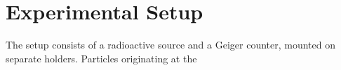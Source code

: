 \section{Experimental Setup}

The setup consists of a radioactive source and a Geiger counter, mounted on separate holders. Particles originating at the 

